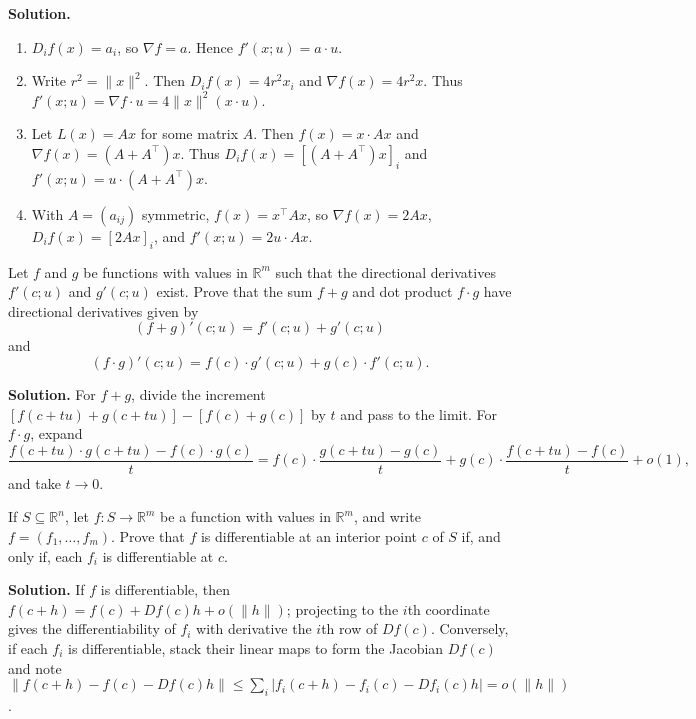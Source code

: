 \noindent\textbf{Solution.}
\begin{enumerate}[label=(\alph*)]
\item $D_i f(x)=a_i$, so $\nabla f=a$. Hence $f'(x;u)=a\cdot u$.
\item Write $r^2=\|x\|^2$. Then $D_i f(x)=4r^2 x_i$ and $\nabla f(x)=4r^2 x$. Thus $f'(x;u)=\nabla f\cdot u=4\|x\|^2(x\cdot u)$.
\item Let $L(x)=Ax$ for some matrix $A$. Then $f(x)=x\cdot Ax$ and $\nabla f(x)=(A+A^{\!\top})x$. Thus $D_i f(x)=[(A+A^{\!\top})x]_i$ and $f'(x;u)=u\cdot (A+A^{\!\top})x$.
\item With $A=(a_{ij})$ symmetric, $f(x)=x^{\!\top}Ax$, so $\nabla f(x)=2Ax$, $D_i f(x)=[2Ax]_i$, and $f'(x;u)=2u\cdot Ax$.
\end{enumerate}

\begin{problembox}
Let \( f \) and \( g \) be functions with values in \( \mathbb{R}^m \) such that the directional derivatives \( f'(c; u) \) and \( g'(c; u) \) exist. Prove that the sum \( f + g \) and dot product \( f \cdot g \) have directional derivatives given by
\[(f + g)'(c; u) = f'(c; u) + g'(c; u)\]
and
\[(f \cdot g)'(c; u) = f(c) \cdot g'(c; u) + g(c) \cdot f'(c; u).\]
\end{problembox}

\noindent\textbf{Solution.}
For $f+g$, divide the increment $[f(c+tu)+g(c+tu)]-[f(c)+g(c)]$ by $t$ and pass to the limit. For $f\cdot g$, expand
\[\frac{f(c+tu)\cdot g(c+tu)-f(c)\cdot g(c)}{t}=f(c)\cdot\frac{g(c+tu)-g(c)}{t}+g(c)\cdot\frac{f(c+tu)-f(c)}{t}+o(1),\]
and take $t\to0$.

\begin{problembox}
If \( S \subseteq \mathbb{R}^n \), let \( f: S \to \mathbb{R}^m \) be a function with values in \( \mathbb{R}^m \), and write \( f = (f_1, \ldots, f_m) \). Prove that \( f \) is differentiable at an interior point \( c \) of \( S \) if, and only if, each \( f_i \) is differentiable at \( c \).
\end{problembox}

\noindent\textbf{Solution.}
If $f$ is differentiable, then $f(c+h)=f(c)+Df(c)h+o(\|h\|)$; projecting to the $i$th coordinate gives the differentiability of $f_i$ with derivative the $i$th row of $Df(c)$. Conversely, if each $f_i$ is differentiable, stack their linear maps to form the Jacobian $Df(c)$ and note $\|f(c+h)-f(c)-Df(c)h\|\le\sum_i |f_i(c+h)-f_i(c)-Df_i(c)h|=o(\|h\|)$.


